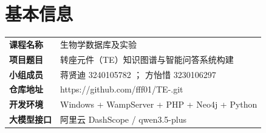 \section*{基本信息}
\begin{table}[H]
  \centering
  \renewcommand{\arraystretch}{1.5}
  \begin{tabular}{>{\bfseries}p{3cm} p{11cm}}
    \toprule
    课程名称 & 生物学数据库及实验 \\
    项目题目 & 转座元件（TE）知识图谱与智能问答系统构建 \\
    小组成员 & 蒋贤迪 3240105782 ； 方怡惜 3230106297 \\
    仓库地址 & https://github.com/fff01/TE-.git \\
    开发环境 & Windows + WampServer + PHP + Neo4j + Python \\
    大模型接口 & 阿里云 DashScope / qwen3.5-plus \\
    \bottomrule
  \end{tabular}
\end{table}

